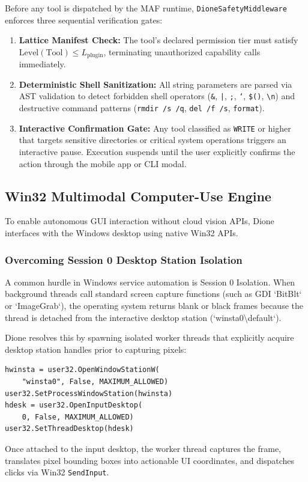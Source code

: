 \documentclass[conference,a4paper]{IEEEtran}
\begin{document}
Before any tool is dispatched by the MAF runtime, \texttt{DioneSafetyMiddleware} enforces three sequential verification gates:
\begin{enumerate}
    \item \textbf{Lattice Manifest Check:} The tool's declared permission tier must satisfy $\text{Level}(\text{Tool}) \le L_{\text{plugin}}$, terminating unauthorized capability calls immediately.
    \item \textbf{Deterministic Shell Sanitization:} All string parameters are parsed via AST validation to detect forbidden shell operators (\texttt{\&}, \texttt{|}, \texttt{;}, \texttt{`}, \texttt{\$()}, \texttt{\textbackslash n}) and destructive command patterns (\texttt{rmdir /s /q}, \texttt{del /f /s}, \texttt{format}).
    \item \textbf{Interactive Confirmation Gate:} Any tool classified as \texttt{WRITE} or higher that targets sensitive directories or critical system operations triggers an interactive pause. Execution suspends until the user explicitly confirms the action through the mobile app or CLI modal.
\end{enumerate}

\subsection{Win32 Multimodal Computer-Use Engine}
To enable autonomous GUI interaction without cloud vision APIs, Dione interfaces with the Windows desktop using native Win32 APIs.

\subsubsection{Overcoming Session 0 Desktop Station Isolation}
A common hurdle in Windows service automation is Session 0 Isolation. When background threads call standard screen capture functions (such as GDI `BitBlt` or `ImageGrab`), the operating system returns blank or black frames because the thread is detached from the interactive desktop station (`winsta0\textbackslash default`).

Dione resolves this by spawning isolated worker threads that explicitly acquire desktop station handles prior to capturing pixels:
\begin{verbatim}
hwinsta = user32.OpenWindowStationW(
    "winsta0", False, MAXIMUM_ALLOWED)
user32.SetProcessWindowStation(hwinsta)
hdesk = user32.OpenInputDesktop(
    0, False, MAXIMUM_ALLOWED)
user32.SetThreadDesktop(hdesk)
\end{verbatim}
Once attached to the input desktop, the worker thread captures the frame, translates pixel bounding boxes into actionable UI coordinates, and dispatches clicks via Win32 \texttt{SendInput}.
\end{document}
